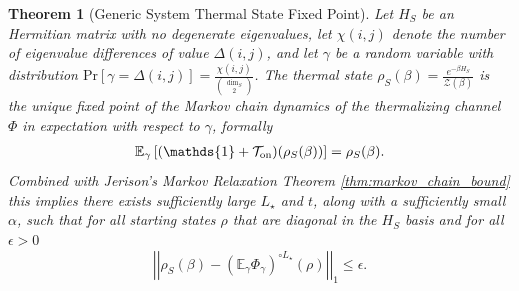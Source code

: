 \documentclass{article}
\newtheorem{theorem}{Theorem}
\newcommand{\on}{\rm on}
\newcommand{\norm}[1]{\left| \left| #1 \right| \right|}
\newcommand{\prob}[1]{\text{Pr}\left[ #1 \right]}
\newcommand{\partfun}{\mathcal{Z}}
\newcommand{\identity}{\mathds{1}}
\begin{document}
\begin{theorem}[Generic System Thermal State Fixed Point]
    Let $H_S$ be an Hermitian matrix with no degenerate eigenvalues, let $\chi(i,j)$ denote the number of eigenvalue differences of value $\Delta(i,j)$, and let $\gamma$ be a random variable with distribution $\prob{\gamma = \Delta(i,j)} = \frac{\chi(i,j)}{\binom{\dim_S}{2}}$. The thermal state $\rho_S(\beta) = \frac{e^{-\beta H_S}}{\partfun(\beta)}$ is the unique fixed point of the Markov chain dynamics of the thermalizing channel $\Phi$ in expectation with respect to $\gamma$, formally
    \begin{align}
        \mathbb{E}_{\gamma} \left[ (\identity + \mathcal{T}_{\on})(\rho_S(\beta)) \right] = \rho_S(\beta).
    \end{align}
    Combined with Jerison's Markov Relaxation Theorem \ref{thm:markov_chain_bound} this implies there exists sufficiently large $L_\star$ and $t$, along with a sufficiently small $\alpha$, such that for all starting states $\rho$ that are diagonal in the $H_S$ basis and for all $\epsilon > 0$
    \begin{equation}
    \norm{\rho_S(\beta) - (\mathbb{E}_\gamma \Phi_\gamma)^{\circ L_\star}(\rho)}_1 \le \epsilon.
    \end{equation}
\end{theorem}
\end{document}
